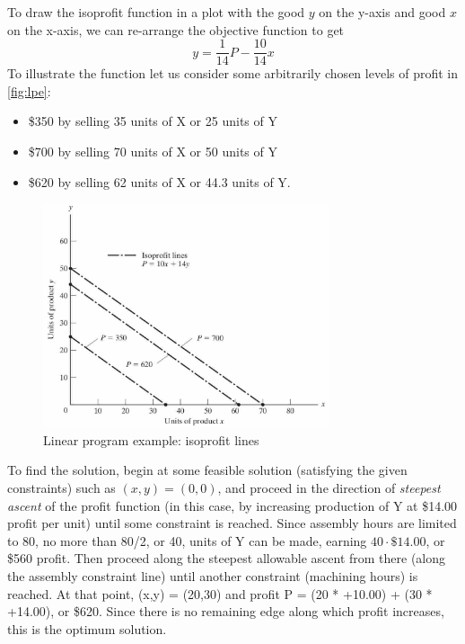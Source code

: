 \documentclass[
  12pt,
  oneside]{book}
\providecommand{\tightlist}{%
  \setlength{\itemsep}{0pt}\setlength{\parskip}{0pt}}
\theoremstyle{definition}
\theoremstyle{definition}
\theoremstyle{definition}
\theoremstyle{definition}
\theoremstyle{remark}
\begin{document}
To draw the isoprofit function in a plot with the good \(y\) on the y-axis and good \(x\) on the x-axis, we can re-arrange the objective function to get \[y=\frac{1}{14}P-\frac{10}{14}x\]
To illustrate the function let us consider some arbitrarily chosen levels of profit in \autoref{fig:lpe}:

\begin{itemize}
\tightlist
\item
  \$350 by selling 35 units of X or 25 units of Y
\item
  \$700 by selling 70 units of X or 50 units of Y
\item
  \$620 by selling 62 units of X or 44.3 units of Y.
\end{itemize}

\begin{figure}
\centering
\includegraphics[width=0.75\textwidth,height=\textheight]{fig/lpe.jpg}
\caption{\label{fig:lpe} Linear program example: isoprofit lines}
\end{figure}

To find the solution, begin at some feasible solution (satisfying the given constraints) such as \((x,y) = (0,0)\), and proceed in the direction of \emph{steepest ascent} of the profit function (in this case, by increasing production of Y at \$14.00 profit per unit) until some constraint is reached. Since assembly hours are limited to 80, no more than 80/2, or 40, units of Y can be made, earning \(40 \cdot \$14.00\), or \$560 profit. Then proceed along the steepest allowable ascent from there (along the assembly constraint line) until another constraint (machining hours) is reached. At that point, (x,y) = (20,30) and profit P = (20 * +10.00) + (30 * +14.00), or \$620. Since there is no remaining edge along which profit increases, this is the optimum solution.
\end{document}

